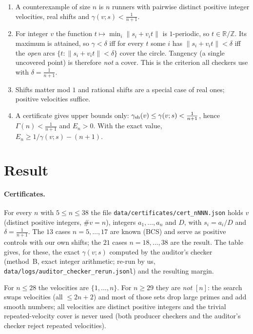 \documentclass[10pt]{article}
\newcommand{\R}{\mathbb{R}}
\newcommand{\Z}{\mathbb{Z}}
\begin{document}
\begin{enumerate}\itemsep=0pt
\item A counterexample of size $n$ is $n$ runners with pairwise distinct positive integer velocities, real shifts and $\gamma(v;s)<\frac1{n+1}$.
\item For integer $v$ the function $t\mapsto\min_i\|s_i+v_it\|$ is $1$-periodic, so $t\in\R/\Z$. Its maximum is attained, so $\gamma<\delta$ iff for every $t$ some $i$ has $\|s_i+v_it\|<\delta$ iff the \emph{open} arcs $\{t:\|s_i+v_it\|<\delta\}$ cover the circle. Tangency (a single uncovered point) is therefore \emph{not} a cover. This is the criterion all checkers use with $\delta=\frac1{n+1}$.
\item Shifts matter mod $1$ and rational shifts are a special case of real ones; positive velocities suffice.
\item A certificate gives upper bounds only: $\gamma_{\rm sh}(v)\le\gamma(v;s)<\frac1{n+1}$, hence $\Gamma(n)<\frac1{n+1}$ and $E_n>0$. With the exact value, $E_n\ge1/\gamma(v;s)-(n+1)$.
\end{enumerate}

\section{Result}\label{sec:results}
\paragraph{Certificates.} For every $n$ with $5\le n\le38$ the file \texttt{data/certificates/cert\_nNNN.json} holds $v$ (distinct positive integers, $\#v=n$), integers $a_1,\dots,a_n$ and $D$, with $s_i=a_i/D$ and $\delta=\frac1{n+1}$. The $13$ cases $n=5,\dots,17$ are known (BCS) and serve as positive controls with our own shifts; the $21$ cases $n=18,\dots,38$ are the result. The table gives, for these, the exact $\gamma(v;s)$ computed by the auditor's checker (method~B, exact integer arithmetic; re-run by us, \texttt{data/logs/auditor\_checker\_rerun.jsonl}) and the resulting margin.

For $n\le28$ the velocities are $\{1,\dots,n\}$. For $n\ge29$ they are \emph{not} $[n]$: the search swaps velocities (all $\le2n+2$) and most of those sets drop large primes and add smooth numbers; all velocities are distinct positive integers and the trivial repeated-velocity cover is never used (both producer checkers and the auditor's checker reject repeated velocities).
\end{document}
